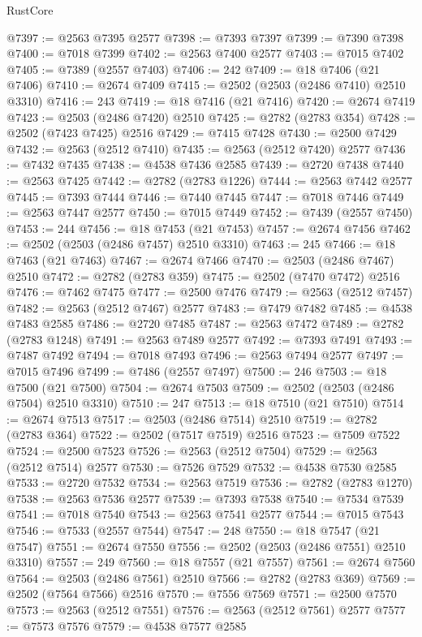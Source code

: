 \begin{lexlean}{RustCore}
\begin{coremodule}
@7397 := @2563 @7395 @2577
@7398 := @7393 @7397
@7399 := @7390 @7398
@7400 := @7018 @7399
@7402 := @2563 @7400 @2577
@7403 := @7015 @7402
@7405 := @7389 (@2557 @7403)
@7406 := 242
@7409 := @18 @7406 (@21 @7406)
@7410 := @2674 @7409
@7415 := @2502 (@2503 (@2486 @7410) @2510 @3310)
@7416 := 243
@7419 := @18 @7416 (@21 @7416)
@7420 := @2674 @7419
@7423 := @2503 (@2486 @7420) @2510
@7425 := @2782 (@2783 @354)
@7428 := @2502 (@7423 @7425) @2516
@7429 := @7415 @7428
@7430 := @2500 @7429
@7432 := @2563 (@2512 @7410)
@7435 := @2563 (@2512 @7420) @2577
@7436 := @7432 @7435
@7438 := @4538 @7436 @2585
@7439 := @2720 @7438
@7440 := @2563 @7425
@7442 := @2782 (@2783 @1226)
@7444 := @2563 @7442 @2577
@7445 := @7393 @7444
@7446 := @7440 @7445
@7447 := @7018 @7446
@7449 := @2563 @7447 @2577
@7450 := @7015 @7449
@7452 := @7439 (@2557 @7450)
@7453 := 244
@7456 := @18 @7453 (@21 @7453)
@7457 := @2674 @7456
@7462 := @2502 (@2503 (@2486 @7457) @2510 @3310)
@7463 := 245
@7466 := @18 @7463 (@21 @7463)
@7467 := @2674 @7466
@7470 := @2503 (@2486 @7467) @2510
@7472 := @2782 (@2783 @359)
@7475 := @2502 (@7470 @7472) @2516
@7476 := @7462 @7475
@7477 := @2500 @7476
@7479 := @2563 (@2512 @7457)
@7482 := @2563 (@2512 @7467) @2577
@7483 := @7479 @7482
@7485 := @4538 @7483 @2585
@7486 := @2720 @7485
@7487 := @2563 @7472
@7489 := @2782 (@2783 @1248)
@7491 := @2563 @7489 @2577
@7492 := @7393 @7491
@7493 := @7487 @7492
@7494 := @7018 @7493
@7496 := @2563 @7494 @2577
@7497 := @7015 @7496
@7499 := @7486 (@2557 @7497)
@7500 := 246
@7503 := @18 @7500 (@21 @7500)
@7504 := @2674 @7503
@7509 := @2502 (@2503 (@2486 @7504) @2510 @3310)
@7510 := 247
@7513 := @18 @7510 (@21 @7510)
@7514 := @2674 @7513
@7517 := @2503 (@2486 @7514) @2510
@7519 := @2782 (@2783 @364)
@7522 := @2502 (@7517 @7519) @2516
@7523 := @7509 @7522
@7524 := @2500 @7523
@7526 := @2563 (@2512 @7504)
@7529 := @2563 (@2512 @7514) @2577
@7530 := @7526 @7529
@7532 := @4538 @7530 @2585
@7533 := @2720 @7532
@7534 := @2563 @7519
@7536 := @2782 (@2783 @1270)
@7538 := @2563 @7536 @2577
@7539 := @7393 @7538
@7540 := @7534 @7539
@7541 := @7018 @7540
@7543 := @2563 @7541 @2577
@7544 := @7015 @7543
@7546 := @7533 (@2557 @7544)
@7547 := 248
@7550 := @18 @7547 (@21 @7547)
@7551 := @2674 @7550
@7556 := @2502 (@2503 (@2486 @7551) @2510 @3310)
@7557 := 249
@7560 := @18 @7557 (@21 @7557)
@7561 := @2674 @7560
@7564 := @2503 (@2486 @7561) @2510
@7566 := @2782 (@2783 @369)
@7569 := @2502 (@7564 @7566) @2516
@7570 := @7556 @7569
@7571 := @2500 @7570
@7573 := @2563 (@2512 @7551)
@7576 := @2563 (@2512 @7561) @2577
@7577 := @7573 @7576
@7579 := @4538 @7577 @2585

\end{coremodule}
\end{lexlean}
